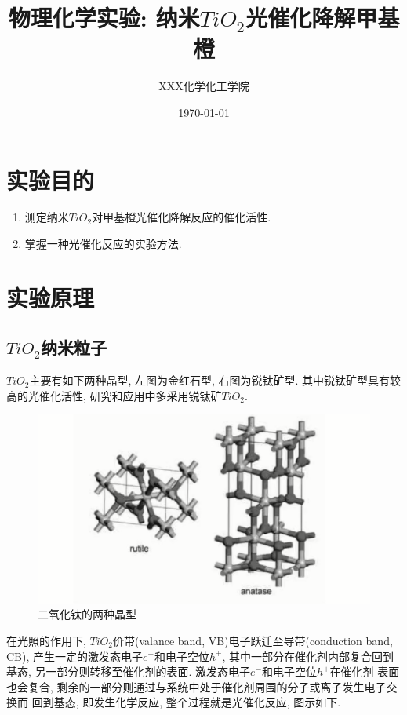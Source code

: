 \documentclass[a4paper]{article}
\title{物理化学实验: 纳米$TiO_{2}$光催化降解甲基橙}
\author{XXX\quad 123456789\quad 化学化工学院}
\date{\today}
\begin{document}
\maketitle
\section{实验目的}
\begin{enumerate}
\item 测定纳米$TiO_{2}$对甲基橙光催化降解反应的催化活性.
\item 掌握一种光催化反应的实验方法.
\end{enumerate}
\section{实验原理}
\subsection{$TiO_{2}$纳米粒子}
$TiO_{2}$主要有如下两种晶型, 左图为金红石型, 右图为锐钛矿型. 
其中锐钛矿型具有较高的光催化活性, 研究和应用中多采用锐钛矿$TiO_{2}$.
\begin{figure}[H]
	\centering
	\includegraphics[width = 0.5\paperwidth]{fig/crystalline.png}
	\caption{二氧化钛的两种晶型}
\end{figure}
\par
在光照的作用下, $TiO_{2}$价带(valance band, VB)电子跃迁至导带(conduction band, CB),
产生一定的激发态电子$e^{-}$和电子空位$h^{+}$, 其中一部分在催化剂内部复合回到
基态, 另一部分则转移至催化剂的表面. 激发态电子$e^{-}$和电子空位$h^{+}$在催化剂
表面也会复合, 剩余的一部分则通过与系统中处于催化剂周围的分子或离子发生电子交换而
回到基态, 即发生化学反应, 整个过程就是光催化反应, 图示如下.
\end{document}
